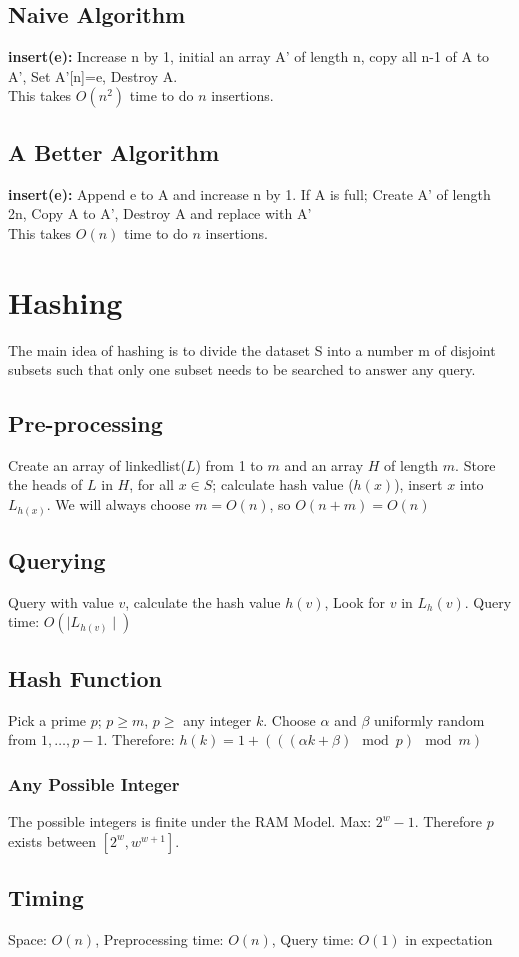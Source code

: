 \documentclass[5pt,a4paper]{article}
\begin{document}
\begin{multicols}{3}
    \subsection{Naive Algorithm}
    \textbf{insert(e):} Increase n by 1, initial an array A' of length n, copy all n-1 of A to A', Set A'[n]=e, Destroy A.\\
    This takes $O(n^2)$ time to do $n$ insertions.
    \subsection{A Better Algorithm}
    \textbf{insert(e):} Append e to A and increase n by 1. If A is full; Create A' of length 2n, Copy A to A', Destroy A and replace with A'\\
    This takes $O(n)$ time to do $n$ insertions.

    \section{Hashing}
    The main idea of hashing is to divide the dataset S into a number m of disjoint subsets such that only one subset needs to be searched to answer any query.
    \subsection{Pre-processing}
    Create an array of linkedlist($L$) from 1 to $m$ and an array $H$ of length $m$. Store the heads of $L$ in $H$, for all $x\in S$; calculate hash value ($h(x)$), insert $x$ into $L_{h(x)}$. We will always choose $m=O(n)$, so $O(n+m)=O(n)$
    \subsection{Querying}
    Query with value $v$, calculate the hash value $h(v)$, Look for $v$ in $L_h(v)$. Query time: $O(\mid L_{h(v)}\mid)$
    \subsection{Hash Function}
    Pick a prime $p$; $p\geq m$, $p\geq$ any integer $k$. Choose $\alpha$ and $\beta$ uniformly random from $1,\ldots,p-1$. Therefore: $h(k)=1+(((\alpha k+\beta)\mod p)\mod m)$
    \subsubsection{Any Possible Integer}
    The possible integers is finite under the RAM Model. Max: $2^w-1$. Therefore $p$ exists between $[2^w,w^{w+1}]$.
    \subsection{Timing}
    Space: $O(n)$, Preprocessing time: $O(n)$, Query time: $O(1)$ in expectation

\end{multicols}
\end{document}
